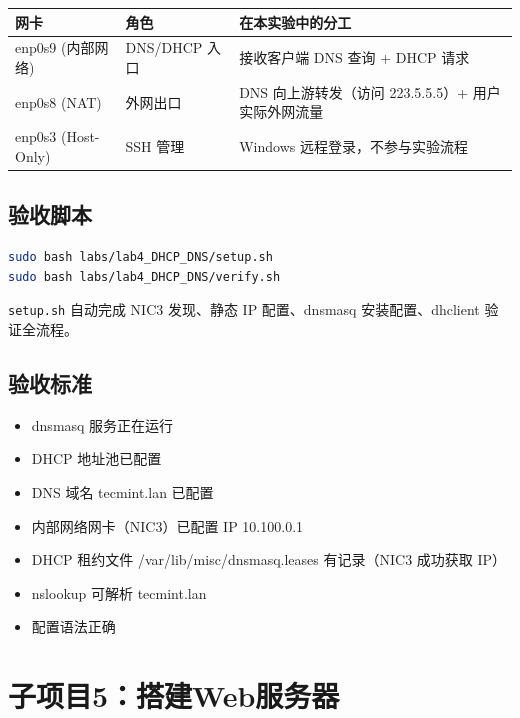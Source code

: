 \documentclass[12pt,a4paper]{ctexart}
\begin{document}
\begin{table}[h]
\centering
\begin{tabular}{p{2.2cm}p{2.5cm}p{9cm}}
\toprule
网卡 & 角色 & 在本实验中的分工 \\
\midrule
enp0s9 (内部网络) & DNS/DHCP 入口 & 接收客户端 DNS 查询 + DHCP 请求 \\
enp0s8 (NAT)       & 外网出口   & DNS 向上游转发（访问 223.5.5.5）+ 用户实际外网流量 \\
enp0s3 (Host-Only) & SSH 管理   & Windows 远程登录，不参与实验流程 \\
\bottomrule
\end{tabular}
\end{table}

\subsection{验收脚本}

\begin{cmdbox}
\begin{lstlisting}[language=bash]
sudo bash labs/lab4_DHCP_DNS/setup.sh
sudo bash labs/lab4_DHCP_DNS/verify.sh
\end{lstlisting}
\end{cmdbox}

\begin{infobox}
  \texttt{setup.sh} 自动完成 NIC3 发现、静态 IP 配置、dnsmasq 安装配置、dhclient 验证全流程。
\end{infobox}

\subsection{验收标准}

\begin{itemize}
  \item dnsmasq 服务正在运行
  \item DHCP 地址池已配置
  \item DNS 域名 tecmint.lan 已配置
  \item 内部网络网卡（NIC3）已配置 IP 10.100.0.1
  \item DHCP 租约文件 /var/lib/misc/dnsmasq.leases 有记录（NIC3 成功获取 IP）
  \item nslookup 可解析 tecmint.lan
  \item 配置语法正确
\end{itemize}

\newpage
\section{子项目5：搭建Web服务器}
\end{document}
